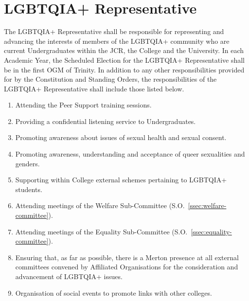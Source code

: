 \section{LGBTQIA+ Representative}
\npara The LGBTQIA+ Representative shall be responsible for representing and advancing the interests of members of the LGBTQIA+ community who are current Undergraduates within the JCR, the College and the University.
\npara In each Academic Year, the Scheduled Election for the LGBTQIA+ Representative shall be in the first OGM of Trinity.
\npara In addition to any other responsibilities provided for by the Constitution and Standing Orders, the responsibilities of the LGBTQIA+ Representative shall include those listed below.
\begin{enumerate}
	\item Attending the Peer Support training sessions.
	\item Providing a confidential listening service to Undergraduates.
	\item Promoting awareness about issues of sexual health and sexual consent.
	\item Promoting awareness, understanding and acceptance of queer sexualities and genders.
	\item Supporting within College external schemes pertaining to LGBTQIA+ students.
	\item Attending meetings of the Welfare Sub-Committee (S.O.~\ref{ssec:welfare-committee}).
	\item Attending meetings of the Equality Sub-Committee (S.O.~\ref{ssec:equality-committee}).
	\item Ensuring that, as far as possible, there is a Merton presence at all external committees convened by Affiliated Organisations for the consideration and advancement of LGBTQIA+ issues.
	\item Organisation of social events to promote links with other colleges.
\end{enumerate}
